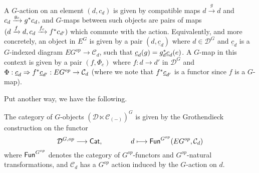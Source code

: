 \documentclass[a4paper,10pt
,draft
]{article}%
\renewcommand{\1}{\ensuremath{\mathbb{id}}}
\begin{document}
A $G$-action on an element $(d,c_d)$ is given by compatible maps
$d \xrightarrow{g} d$ and
$c_d \xrightarrow{g_c} g^{\**}c_d$,
and $G$-maps between such objects
are pairs of maps $(d \xrightarrow{f} d, c_d \xrightarrow{f_c} f^{\**}c_{d'})$ which commute with the action.
Equivalently, and more concretely,
an object in $E^G$ is given by a pair $(d, \underline{c}_d)$ where
$d \in \mathcal D^G$ and
$\underline{c}_d$ is a $G$-indexed diagram $E G^{op} \to \mathcal C_d$,
such that $\underline{c}_d(g) = g_{d}^{\**}\underline{c}_d(e)$.
A $G$-map in this context is given by a pair $(f, \Phi_c)$ where
$f: d \to d'$ in $\mathcal D^G$ and
$\Phi: \underline{c}_d \Rightarrow f^{\**}\underline{c}_{d'}: E G^{op} \to \mathcal C_d$
(where we note that $f^{\**}\underline{c}_{d'}$ is a functor since $f$ is a $G$-map).

Put another way, we have the following.
\begin{lemma}
      \label{G_GR_LEM}
      The category of $G$-objects
      $\left(\mathcal D \ltimes \mathcal C_{(-)}\right)^G$
      is given by the Grothendieck construction on the functor
      \begin{equation}
            \mathcal D^{G,op} \longrightarrow \mathsf{Cat},
            \qquad \qquad
            d \longmapsto \mathsf{Fun}^{G^{op}}(E G^{op}, \mathcal C_d)
      \end{equation}
      where $\mathsf{Fun}^{G^{op}}$ denotes the category of $G^{op}$-functors and $G^{op}$-natural transformations,
      and $\mathcal C_d$ has a $G^{op}$ action induced by the $G$-action on $d$.
\end{lemma}
\end{document}
